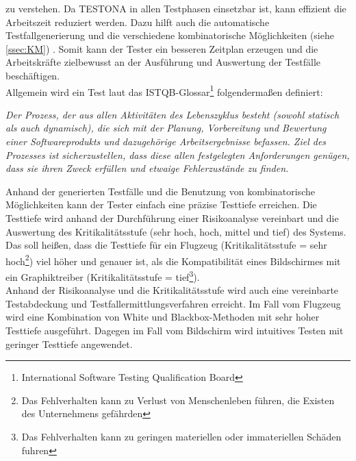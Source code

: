 zu verstehen. Da TESTONA in allen Testphasen einsetzbar ist, kann effizient die Arbeitszeit reduziert werden. Dazu hilft auch die automatische Testfallgenerierung und die verschiedene kombinatorische Möglichkeiten (siehe \ref{ssec:KM}) . Somit kann der Tester ein besseren Zeitplan erzeugen und die Arbeitskräfte zielbewusst an der Ausführung und Auswertung der Testfälle beschäftigen.\\

Allgemein wird ein Test laut das ISTQB-Glossar\footnote{International Software Testing Qualification Board} folgendermaßen definiert:

\begin{center}
\textit{
Der Prozess, der aus allen Aktivitäten des Lebenszyklus besteht (sowohl statisch als auch dynamisch), die sich mit der Planung, Vorbereitung und Bewertung einer Softwareprodukts und dazugehörige Arbeitsergebnisse befassen. Ziel des Prozesses ist sicherzustellen, dass diese allen festgelegten Anforderungen genügen, dass sie ihren Zweck erfüllen und etwaige Fehlerzustände zu finden.}\cite{SoftwareTestEmbSys}\\

\end{center}

Anhand der generierten Testfälle und die Benutzung von  kombinatorische Möglichkeiten kann der Tester einfach eine präzise Testtiefe erreichen. Die Testtiefe wird anhand der Durchführung einer Risikoanalyse vereinbart und die Auswertung des Kritikalitätsstufe (sehr hoch, hoch, mittel und tief) des Systems. Das soll heißen, dass die Testtiefe für ein Flugzeug (Kritikalitätsstufe = sehr hoch\footnote{Das Fehlverhalten kann zu Verlust von Menschenleben führen, die Existen des Unternehmens gefährden}) viel höher und genauer ist, als die Kompatibilität eines Bildschirmes mit ein Graphiktreiber (Kritikalitätsstufe = tief\footnote{Das Fehlverhalten kann zu geringen materiellen oder immateriellen Schäden fuhren}).\\

Anhand der Risikoanalyse und die Kritikalitätsstufe wird auch eine vereinbarte Testabdeckung und Testfallermittlungsverfahren erreicht. Im Fall vom Flugzeug wird eine Kombination von White und Blackbox-Methoden mit sehr hoher Testtiefe ausgeführt. Dagegen im Fall vom Bildschirm wird intuitives Testen mit geringer Testtiefe angewendet.\cite{ApplicationEngineering}

